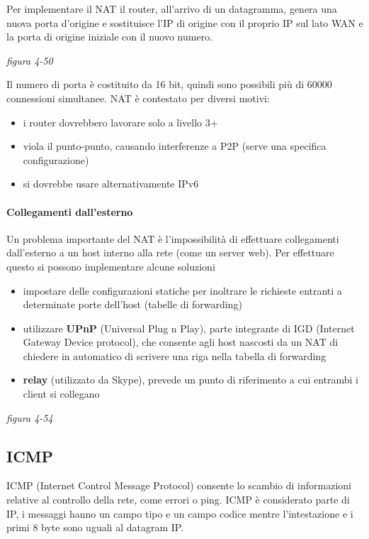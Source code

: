 \documentclass[
]{article}
\begin{document}
Per implementare il NAT il router, all'arrivo di un datagramma, genera
una nuova porta d'origine e sostituisce l'IP di origine con il proprio
IP sul lato WAN e la porta di origine iniziale con il nuovo numero.

\emph{figura 4-50}

Il numero di porta è costituito da 16 bit, quindi sono possibili più di
60000 connessioni simultanee. NAT è contestato per diversi motivi:

\begin{itemize}
\item
  i router dovrebbero lavorare solo a livello 3+
\item
  viola il punto-punto, causando interferenze a P2P (serve una specifica
  configurazione)
\item
  si dovrebbe usare alternativamente IPv6
\end{itemize}

\hypertarget{header-n141}{%
\paragraph{Collegamenti dall'esterno}\label{header-n141}}

Un problema importante del NAT è l'impossibilità di effettuare
collegamenti dall'esterno a un host interno alla rete (come un server
web). Per effettuare questo si possono implementare alcune soluzioni

\begin{itemize}
\item
  impostare delle configurazioni statiche per inoltrare le richieste
  entranti a determinate porte dell'host (tabelle di forwarding)
\item
  utilizzare \textbf{UPnP} (Universal Plug n Play), parte integrante di
  IGD (Internet Gateway Device protocol), che consente agli host
  nascosti da un NAT di chiedere in automatico di scrivere una riga
  nella tabella di forwarding
\item
  \textbf{relay} (utilizzato da Skype), prevede un punto di riferimento
  a cui entrambi i client si collegano
\end{itemize}

\emph{figura 4-54}

\hypertarget{header-n151}{%
\subsection{ICMP}\label{header-n151}}

ICMP (Internet Control Message Protocol) consente lo scambio di
informazioni relative al controllo della rete, come errori o ping. ICMP
è considerato parte di IP, i messaggi hanno un campo tipo e un campo
codice mentre l'intestazione e i primi 8 byte sono uguali al datagram
IP.
\end{document}
